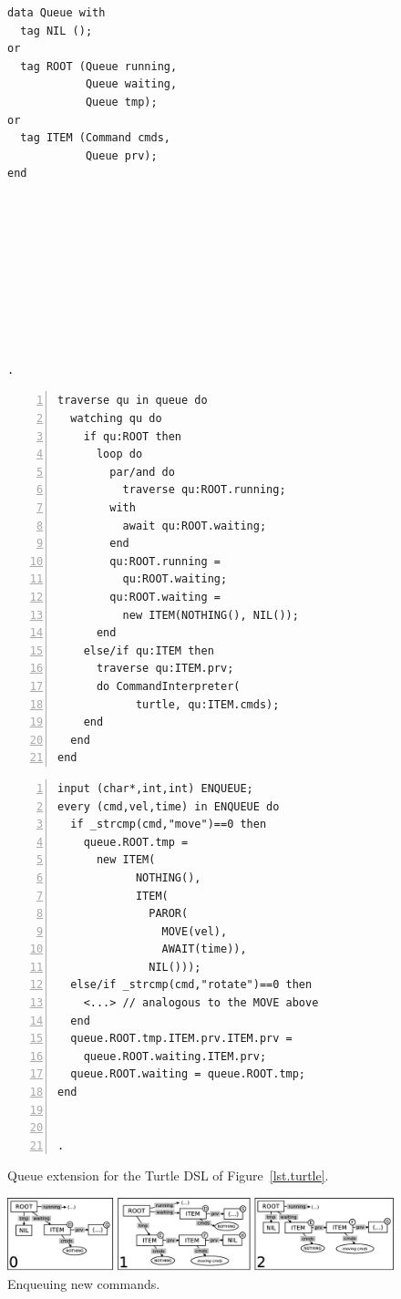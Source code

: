 \documentclass{sig-alternate}
\newcommand{\code}[1] {{\small{\texttt{#1}}}}
\begin{document}
\begin{figure}[t]
\begin{minipage}[t]{0.22\linewidth}
\begin{lstlisting}[title=CODE-3: \code{Queue} type]
data Queue with
  tag NIL ();
or
  tag ROOT (Queue running,
            Queue waiting,
            Queue tmp);
or
  tag ITEM (Command cmds,
            Queue prv);
end










.
\end{lstlisting}
\end{minipage}
%
\begin{minipage}[t]{0.36\linewidth}
\begin{lstlisting}[numbers=left,xleftmargin=3.5em,title=CODE-4: Queue traversal]
traverse qu in queue do
  watching qu do
    if qu:ROOT then
      loop do
        par/and do
          traverse qu:ROOT.running;
        with
          await qu:ROOT.waiting;
        end
        qu:ROOT.running =
          qu:ROOT.waiting;
        qu:ROOT.waiting =
          new ITEM(NOTHING(), NIL());
      end
    else/if qu:ITEM then
      traverse qu:ITEM.prv;
      do CommandInterpreter(
            turtle, qu:ITEM.cmds);
    end
  end
end
\end{lstlisting}
\end{minipage}
%
\begin{minipage}[t]{0.39\linewidth}
\begin{lstlisting}[numbers=left,xleftmargin=3.5em,title=CODE-5: Enqueuing commands]
input (char*,int,int) ENQUEUE;
every (cmd,vel,time) in ENQUEUE do
  if _strcmp(cmd,"move")==0 then
    queue.ROOT.tmp =
      new ITEM(
            NOTHING(),
            ITEM(
              PAROR(
                MOVE(vel),
                AWAIT(time)),
              NIL()));
  else/if _strcmp(cmd,"rotate")==0 then
    <...> // analogous to the MOVE above
  end
  queue.ROOT.tmp.ITEM.prv.ITEM.prv =
    queue.ROOT.waiting.ITEM.prv;
  queue.ROOT.waiting = queue.ROOT.tmp;
end


.
\end{lstlisting}
\end{minipage}
%
\caption{ Queue extension for the Turtle DSL of
          Figure~\ref{lst.turtle}.
\label{lst.turtle.queue}
}
\end{figure}

\setcounter{figure}{9}
\begin{figure}[b]
\centering
\includegraphics[scale=0.24]{queue-fig-2.eps}
\caption{
Enqueuing new commands.
\label{fig.queue-2}
}
\end{figure}
\end{document}
